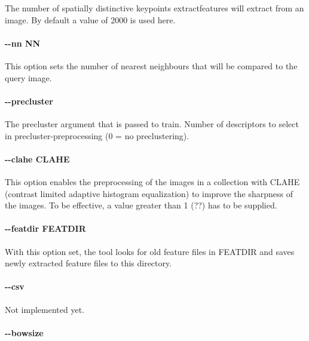 \documentclass{hitec}
\begin{document}
The number of spatially distinctive keypoints {\ttfamily extractfeatures} will extract from
an image. By default a value of 2000 is used here.

\paragraph{\ttfamily-{}-nn NN}

This option sets the number of nearest neighbours that will be compared to the query
image. 

\paragraph{\ttfamily-{}-precluster}
The precluster argument that is passed to {\ttfamily train}.
Number of descriptors to select in precluster-preprocessing (0 = no preclustering).

\paragraph{\ttfamily-{}-clahe CLAHE}

This option enables the preprocessing of the images in a collection with CLAHE 
(contrast limited adaptive histogram equalization) to improve the sharpness
of the images. To be effective, a value greater than 1 (??) has to be supplied.


\paragraph{\ttfamily-{}-featdir FEATDIR}

With this option set, the tool looks for old feature files in FEATDIR and saves
newly extracted feature files to this directory.


\paragraph{\ttfamily-{}-csv}

Not implemented yet.

\paragraph{\ttfamily-{}-bowsize}
\end{document}
